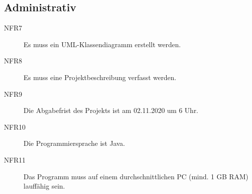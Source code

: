 \documentclass[a4paper]{report}
\begin{document}
\subsection{Administrativ}
\begin{description}
    \item[NFR7] Es muss ein UML-Klassendiagramm erstellt werden.
    \item[NFR8] Es muss eine Projektbeschreibung verfasst werden.
    \item[NFR9] Die Abgabefrist des Projekts ist am 02.11.2020 um 6 Uhr.
    \item[NFR10] Die Programmiersprache ist Java.
    \item[NFR11] Das Programm muss auf einem durchschnittlichen PC (mind. 1 GB RAM) lauffähig sein. 
\end{description}
\end{document}
